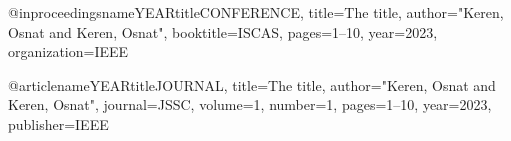 
@inproceedings{nameYEARtitleCONFERENCE,
  title={The title},
  author="Keren, Osnat and Keren, Osnat",
  booktitle=ISCAS,
  pages={1--10},
  year={2023},
  organization={IEEE}
}

@article{nameYEARtitleJOURNAL,
  title={The title},
  author="Keren, Osnat and Keren, Osnat",
  journal=JSSC,
  volume={1},
  number={1},
  pages={1--10},
  year={2023},
  publisher={IEEE}
}
